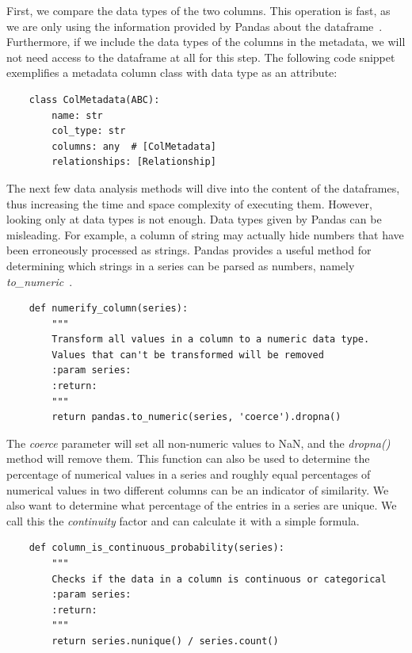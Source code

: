 \bigbreak

First, we compare the data types of the two columns.
This operation is fast, as we are only using the information provided by Pandas about the dataframe~\cite{pandasDtypes}.
Furthermore, if we include the data types of the columns in the metadata, we will not need access to the dataframe at
all for this step.
The following code snippet exemplifies a metadata column class with data type as an attribute:

\begin{verbatim}
    class ColMetadata(ABC):
        name: str
        col_type: str
        columns: any  # [ColMetadata]
        relationships: [Relationship]
\end{verbatim}

The next few data analysis methods will dive into the content of the dataframes, thus increasing the time and space
complexity of executing them.
However, looking only at data types is not enough.
Data types given by Pandas can be misleading.
For example, a column of string may actually hide numbers that have been erroneously processed as strings.
Pandas provides a useful method for determining which strings in a series can be parsed as numbers, namely
\textit{to\_numeric}~\cite{pandasToNumeric}.

\begin{verbatim}
    def numerify_column(series):
        """
        Transform all values in a column to a numeric data type.
        Values that can't be transformed will be removed
        :param series:
        :return:
        """
        return pandas.to_numeric(series, 'coerce').dropna()
\end{verbatim}

The \textit{coerce} parameter will set all non-numeric values to NaN, and the \textit{dropna()} method will remove them.
This function can also be used to determine the percentage of numerical values in a series and roughly equal
percentages of numerical values in two different columns can be an indicator of similarity.
We also want to determine what percentage of the entries in a series are unique.
We call this the \textit{continuity} factor and can calculate it with a simple formula.

\begin{verbatim}
    def column_is_continuous_probability(series):
        """
        Checks if the data in a column is continuous or categorical
        :param series:
        :return:
        """
        return series.nunique() / series.count()
\end{verbatim}


